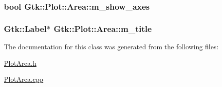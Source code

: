 \label{classGtk_1_1Plot_1_1Area_ad3f7f9608995f133a30760540a0ed745}
\hypertarget{classGtk_1_1Plot_1_1Area_ae7bc177b3fd37a14aed42cbbc8051386}{
\subsubsection[{m\_\-show\_\-axes}]{\setlength{\rightskip}{0pt plus 5cm}bool {\bf Gtk::Plot::Area::m\_\-show\_\-axes}}}
\label{classGtk_1_1Plot_1_1Area_ae7bc177b3fd37a14aed42cbbc8051386}
\hypertarget{classGtk_1_1Plot_1_1Area_ab3723bf8b688502a83052ae90f4d931a}{
\subsubsection[{m\_\-title}]{\setlength{\rightskip}{0pt plus 5cm}Gtk::Label$\ast$ {\bf Gtk::Plot::Area::m\_\-title}}}
\label{classGtk_1_1Plot_1_1Area_ab3723bf8b688502a83052ae90f4d931a}


The documentation for this class was generated from the following files:\begin{DoxyCompactItemize}
\item 
\hyperlink{PlotArea_8h}{PlotArea.h}\item 
\hyperlink{PlotArea_8cpp}{PlotArea.cpp}\end{DoxyCompactItemize}
